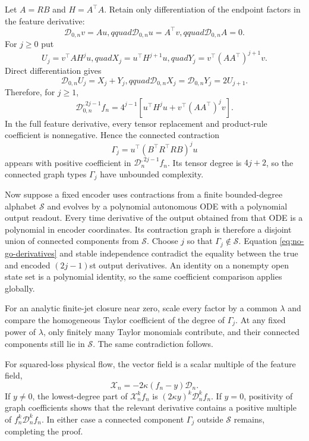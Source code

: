 Let $A=RB$ and $H=A^\top A$.  Retain only differentiation of the endpoint
factors in the feature derivative:
\begin{equation}
 \mathcal D_{0,n}v=Au,qquad
 \mathcal D_{0,n}u=A^\top v,qquad
 \mathcal D_{0,n}A=0.
\end{equation}
For $j\ge0$ put
\begin{equation}
 U_j=v^\top AH^ju,quad
 X_j=u^\top H^{j+1}u,quad
 Y_j=v^\top(AA^\top)^{j+1}v.
\end{equation}
Direct differentiation gives
\begin{equation}
 \mathcal D_{0,n}U_j=X_j+Y_j,qquad
 \mathcal D_{0,n}X_j=\mathcal D_{0,n}Y_j=2U_{j+1}.
\end{equation}
Therefore, for $j\ge1$,
\begin{equation}
 \mathcal D_{0,n}^{,2j-1}f_n
 =4^{j-1}\left[u^\top H^ju+v^\top(AA^\top)^jv\right].
 \label{eq:no-go-derivatives}
\end{equation}
In the full feature derivative, every tensor replacement and product-rule
coefficient is nonnegative.  Hence the connected contraction
\begin{equation}
 \Gamma_j=u^\top(B^\top R^\top RB)^ju
\end{equation}
appears with positive coefficient in
$\mathcal D_n^{,2j-1}f_n$.  Its tensor degree is $4j+2$, so the connected
graph types $\Gamma_j$ have unbounded complexity.

Now suppose a fixed encoder uses contractions from a finite bounded-degree
alphabet $\mathcal S$ and evolves by a polynomial autonomous ODE with a
polynomial output readout.  Every time derivative of the output obtained from
that ODE is a polynomial in encoder coordinates.  Its contraction graph is
therefore a disjoint union of connected components from $\mathcal S$.  Choose
$j$ so that $\Gamma_j\notin\mathcal S$.  Equation
\eqref{eq:no-go-derivatives} and stable independence contradict the equality
between the true and encoded $(2j-1)$st output derivatives.  An identity on a
nonempty open state set is a polynomial identity, so the same coefficient
comparison applies globally.

For an analytic finite-jet closure near zero, scale every factor by a common
$\lambda$ and compare the homogeneous Taylor coefficient of the degree of
$\Gamma_j$.  At any fixed power of $\lambda$, only finitely many Taylor
monomials contribute, and their connected components still lie in
$\mathcal S$.  The same contradiction follows.

For squared-loss physical flow, the vector field is a scalar multiple of the
feature field,
\begin{equation}
 \mathcal X_n=-2\kappa(f_n-y)\mathcal D_n.
\end{equation}
If $y\ne0$, the lowest-degree part of
$\mathcal X_n^kf_n$ is $(2\kappa y)^k\mathcal D_n^kf_n$.  If $y=0$, positivity
of graph coefficients shows that the relevant derivative contains a positive
multiple of $f_n^k\mathcal D_n^kf_n$.  In either case a connected component
$\Gamma_j$ outside $\mathcal S$ remains, completing the proof.

